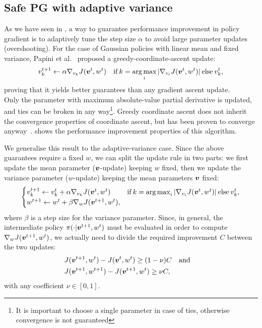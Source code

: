 \subsection{Safe PG with adaptive variance}\label{sec:safe+explore}
As we have seen in , a way to guarantee performance improvement in policy gradient is to adaptively tune the step size $\alpha$  to avoid large parameter updates (overshooting). For the case of Gaussian policies with linear mean and fixed variance, Papini et al.~\cite{adaptive_batch} proposed a greedy-coordinate-ascent update:
\begin{align}\label{up:onlyv}
v_{k}^{t+1} \gets \alpha\gradJ[v_{k}]{\vv^t,w^t}
\quad \text{if}\:k =  \argmax_i |\gradJ[v_i]{\vv^t, w^t}| \:\text{else}\:v_{k}^t,
\end{align}
proving that it yields better guarantees than any gradient ascent update.\\
Only the parameter with maximum absolute-value partial derivative is updated, and ties can be broken in any way\footnote{It is important to choose a single parameter in case of ties, otherwise convergence is not guaranteed}. Greedy coordinate ascent does not inherit the convergence properties of coordinate ascent, but has been proven to converge anyway~\cite{nutinicoordinate}.  shows the performance improvement properties of this algorithm.


We generalise this result to the adaptive-variance case. Since the above guarantees require a fixed $w$, we can split the update rule in two parts: we first update the mean parameter ($\vv$-update) keeping $w$ fixed, then we update the variance parameter ($w$-update) keeping the mean parameters $\vv$ fixed:
%
\begin{align}\label{eq:naive_update}
\begin{cases}
v_{k}^{t+1} \gets v_{k}^t + \alpha\gradJ[v_{k}]{\vv^t,w^t}
	& \text{if}\:k =  \argmax_i |\gradJ[v_i]{\vv^t, w^t}| \:\text{else}\:v_{k}^t,\\
w^{t+1} \gets w^t + \beta\gradJ[w]{\vv^{t+1}, w^t},
\end{cases}
\end{align}
%
where $\beta$ is a step size for the variance parameter.
Since, in general, the intermediate policy $\pi(\cdot\vert\vv^{t+1},w^t)$ must be evaluated in order to compute $\gradJ[w]{\vv^{t+1},w^t}$, we actually need to divide the required improvement $C$ between the two updates:
%
\begin{align}%
&J(\vv^{t+1},w^t) - J(\vv^t,w^t) \geq (1-\nu) C \quad \text{and}\quad \label{eq:update-first} \\ 
&J(\vv^{t+1},w^{t+1}) - J(\vv^{t+1},w^t) \geq \nu C, \label{eq:update-second}
\end{align}
with any coefficient $\nu \in [0,1]$.

